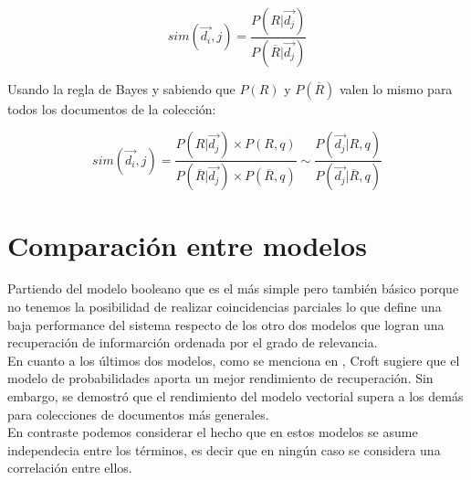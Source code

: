 			\begin{equation}
				sim(\overrightarrow{d_{i}},j) = \frac{P(R | \overrightarrow{d_{j}})}{P(\overline{R} | \overrightarrow{d_{j}})}
			\end{equation}	
				
Usando la regla de Bayes y sabiendo que $P(R)$ y $P(\overline{R})$ valen lo mismo para todos los documentos de la colección:

			\begin{equation}
				sim(\overrightarrow{d_{i}},j) = \frac{P(R | \overrightarrow{d_{j}}) \times P(R,q)}{P(\overline{R} | \overrightarrow{d_{j}}) \times P(\overline{R},q)} \sim  \frac{P(\overrightarrow{d_{j}} | R, q)}{P( \overrightarrow{d_{j}} | \overline{R}, q)}
			\end{equation}	
				


\section{Comparación entre modelos}

Partiendo del modelo booleano que es el más simple pero también básico porque no tenemos la posibilidad de realizar coincidencias parciales lo que define una baja performance del sistema respecto de los otro dos modelos que logran una recuperación de informarción ordenada por el grado de relevancia. \\
En cuanto a los últimos dos modelos, como se menciona en \cite{baeza1999}, Croft sugiere que el modelo de probabilidades aporta un mejor rendimiento de recuperación. Sin embargo, se demostró que el rendimiento del modelo vectorial supera a los demás para colecciones de documentos más generales.\\
En contraste podemos considerar el hecho que en estos modelos se asume independecia entre los términos, es decir que en ningún caso se considera una correlación entre ellos.
